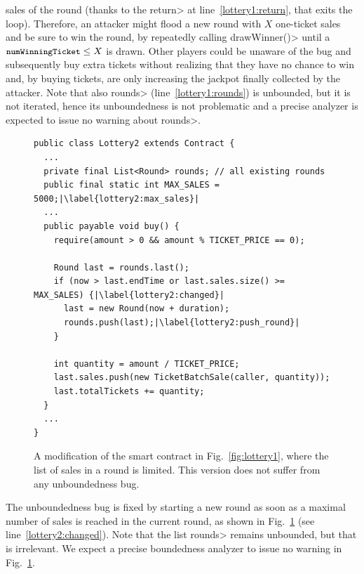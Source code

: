 sales of the round (thanks to the \<return> at line~\ref{lottery1:return}, that
exits the loop). Therefore,
an attacker might flood a new round with $X$ one-ticket sales and be sure to win
the round, by repeatedly calling \<drawWinner()> until a
$\<numWinningTicket>\le X$ is drawn. Other players could be unaware of the bug and
subsequently buy extra tickets without realizing that they have no chance to win and,
by buying tickets, are only increasing the jackpot finally collected by the attacker.
Note that also \<rounds> (line~\ref{lottery1:rounds}) is unbounded,
but it is not iterated,
hence its unboundedness is not problematic and a precise analyzer is expected to
issue no warning about \<rounds>.
%
\begin{figure}[t]
  \begin{lstlisting}[language=pseudo]
public class Lottery2 extends Contract {
  ...
  private final List<Round> rounds; // all existing rounds
  public final static int MAX_SALES = 5000;|\label{lottery2:max_sales}|
  ...
  public payable void buy() {
    require(amount > 0 && amount % TICKET_PRICE == 0);

    Round last = rounds.last();
    if (now > last.endTime or last.sales.size() >= MAX_SALES) {|\label{lottery2:changed}|
      last = new Round(now + duration);
      rounds.push(last);|\label{lottery2:push_round}|
    }

    int quantity = amount / TICKET_PRICE;
    last.sales.push(new TicketBatchSale(caller, quantity));
    last.totalTickets += quantity;
  }
  ...
}
  \end{lstlisting}
  \caption{A modification of the smart contract in Fig.~\ref{fig:lottery1},
    where the list of sales in a round is limited. This version does not
    suffer from any unboundedness bug.}
  \label{fig:lottery2}
\end{figure}
%
The unboundedness bug is fixed by starting
a new round as soon as a maximal number of sales is reached in the current round, as shown in
Fig.~\ref{fig:lottery2} (see line~\ref{lottery2:changed}). Note that the list \<rounds> remains unbounded, but that
is irrelevant. We expect a precise boundedness analyzer to issue no
warning in Fig.~\ref{fig:lottery2}.

